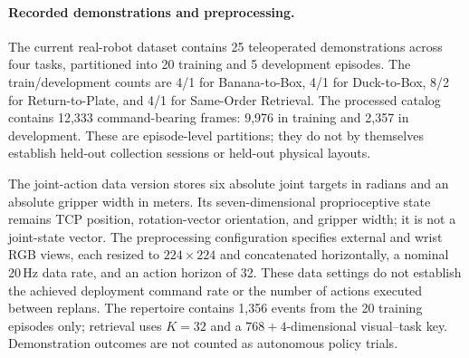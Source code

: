\paragraph{Recorded demonstrations and preprocessing.}
The current real-robot dataset contains 25 teleoperated demonstrations across
four tasks, partitioned into 20 training and 5 development episodes.
The train/development counts are 4/1 for Banana-to-Box, 4/1 for Duck-to-Box,
8/2 for Return-to-Plate, and 4/1 for Same-Order Retrieval.
The processed catalog contains 12,333 command-bearing frames:
9,976 in training and 2,357 in development.
These are episode-level partitions; they do not by themselves establish
held-out collection sessions or held-out physical layouts.

The joint-action data version stores six absolute joint targets in radians
and an absolute gripper width in meters.
Its seven-dimensional proprioceptive state remains TCP position,
rotation-vector orientation, and gripper width; it is not a joint-state vector.
The preprocessing configuration specifies external and wrist RGB views,
each resized to $224\times224$ and concatenated horizontally, a nominal
20\,Hz data rate, and an action horizon of 32.
These data settings do not establish the achieved deployment command rate
or the number of actions executed between replans.
The repertoire contains 1,356 events from the 20 training episodes only;
retrieval uses $K=32$ and a $768+4$-dimensional visual--task key.
Demonstration outcomes are not counted as autonomous policy trials.
